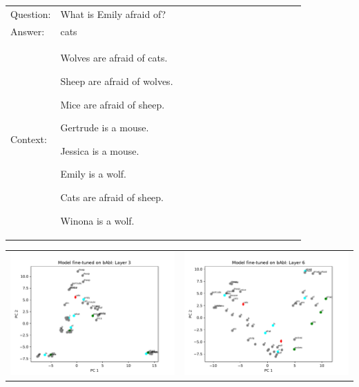 \documentclass{article}
\begin{document}
	\begin{tabular}{ l p{0.85\linewidth} }
		Question: & What is Emily afraid of? \\
		Answer: & cats \\
		Context: & Wolves are afraid of cats. 
		
		Sheep are afraid of wolves. 
		
		Mice are afraid of sheep. 
		
		Gertrude is a mouse. 
		
		Jessica is a mouse. 
		
		Emily is a wolf. 
		
		Cats are afraid of sheep. 
		
		Winona is a wolf. \\
	\end{tabular}
	
	\begin{center}
		\begin{tabular}{ c c }
			\includegraphics[scale=0.4]{../badges/reproduced/visualization/babi/model-fine-tuned-on-babi--layer-3.pdf} &
			\includegraphics[scale=0.4]{../badges/reproduced/visualization/babi/model-fine-tuned-on-babi--layer-6.pdf} 
		\end{tabular}
	\end{center}
\end{document}
